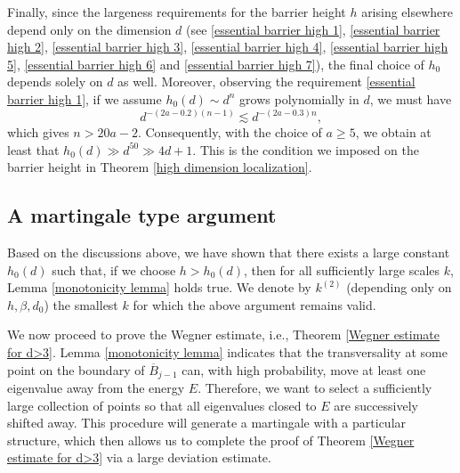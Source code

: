 \documentclass[11pt,reqno,UTF8,twoside]{amsart}
\newcommand{\barB}{\overline{B}}
\theoremstyle{definition}
\numberwithin{equation}{section}
\begin{document}
Finally, since the largeness requirements for the barrier height $h$ arising elsewhere depend only on the dimension $d$ (see \eqref{essential barrier high 1}, \eqref{essential barrier high 2}, \eqref{essential barrier high 3}, \eqref{essential barrier high 4}, \eqref{essential barrier high 5}, \eqref{essential barrier high 6} and \eqref{essential barrier high 7}), the final choice of $h_0$ depends solely on $d$ as well. 
Moreover, observing the requirement \eqref{essential barrier high 1}, if we assume $h_0(d)\sim d^n$ grows polynomially in $d$, we must have 
\[d^{-(2a-0.2)(n-1)} \lesssim d^{-(2a-0.3)n},\]
which gives $n>20a-2$. Consequently, with the choice of  $a\geq 5$, we obtain at least that $h_0(d)\gg d^{50}\gg 4d+1$. This is the condition we imposed on the barrier height in Theorem \ref{high dimension localization}.

  

  








\subsection{A martingale type  argument}\label{martingale section}


Based on the discussions above, we have shown that there exists a large constant $h_0(d)$ such that, if we choose $h>h_0(d)$, then for all sufficiently large scales $k$,  Lemma \ref{monotonicity lemma} holds true. We denote by $k^{(2)}$ (depending only  on $h,\beta,d_0$) the smallest $k$  for  which the above argument remains valid. 

We now proceed to prove the Wegner estimate, i.e., Theorem \ref{Wegner estimate for d>3}.  Lemma \ref{monotonicity lemma} indicates  that the transversality at some point on the boundary of $\barB_{j-1}$ can, with high probability, move at least one eigenvalue away from the energy $E$. Therefore, we want to select a sufficiently large collection of points so that all eigenvalues closed  to $E$ are successively shifted away. This procedure will  generate  a martingale with a particular structure, which then allows us to complete the proof of Theorem \ref{Wegner estimate for d>3} via a large deviation estimate.
\end{document}
